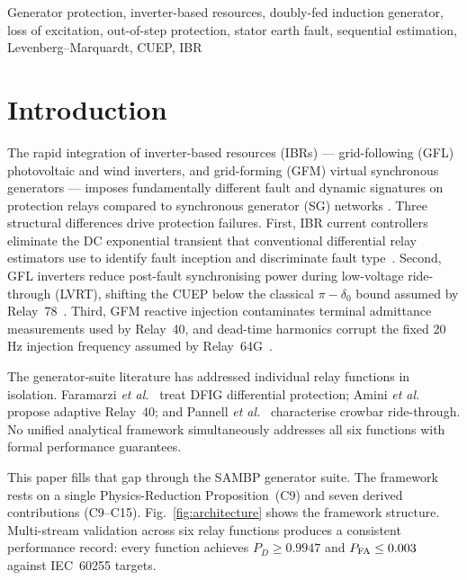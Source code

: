 \documentclass[journal,twoside]{IEEEtran}
\begin{document}
\begin{IEEEkeywords}
Generator protection, inverter-based resources, doubly-fed induction generator,
loss of excitation, out-of-step protection, stator earth fault, sequential
estimation, Levenberg--Marquardt, CUEP, IBR
\end{IEEEkeywords}

\section{Introduction}
\label{sec:intro}

The rapid integration of inverter-based resources (IBRs) --- grid-following
(GFL) photovoltaic and wind inverters, and grid-forming (GFM) virtual
synchronous generators --- imposes fundamentally different fault and dynamic
signatures on protection relays compared to synchronous generator (SG) networks
\cite{Telukunta2017,Hooshyar2019}.
Three structural differences drive protection failures.
First, IBR current controllers eliminate the DC exponential transient that
conventional differential relay estimators use to identify fault inception and
discriminate fault type~\cite{Plet2011,Morren2007}.
Second, GFL inverters reduce post-fault synchronising power during low-voltage
ride-through (LVRT), shifting the CUEP below the classical
$\pi - \delta_0$ bound assumed by Relay~78~\cite{Kundur1994,Vittal2019}.
Third, GFM reactive injection contaminates terminal admittance measurements used
by Relay~40, and dead-time harmonics corrupt the fixed 20\,Hz injection
frequency assumed by Relay~64G~\cite{Reimert2006,Mozina2008}.

The generator-suite literature has addressed individual relay functions in
isolation.
Faramarzi \textit{et al.}\ \cite{Faramarzi2022} treat DFIG differential
protection; Amini \textit{et al.}\ \cite{Amini2014} propose adaptive Relay~40;
and Pannell \textit{et al.}\ \cite{Pannell2010} characterise crowbar ride-through.
No unified analytical framework simultaneously addresses all six functions with
formal performance guarantees.

This paper fills that gap through the SAMBP generator suite.
The framework rests on a single Physics-Reduction Proposition~(C9) and seven
derived contributions (C9--C15).
Fig.~\ref{fig:architecture} shows the framework structure.
Multi-stream validation across six relay functions produces a consistent
performance record: every function achieves $P_D \geq 0.9947$ and
$P_{\rm FA} \leq 0.003$ against IEC~60255 targets.
\end{document}
